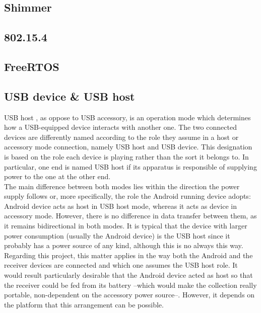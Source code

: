 		\subsection{Shimmer}
		\subsection{802.15.4}
		\label{ssec:802.15.4}
		\subsection{FreeRTOS}
		\label{ssec:FreeRTOS}
		\subsection{USB device \& USB host}
			USB host \cite{usbhost}, as oppose to USB accessory, is an operation mode which determines how a
			USB-equipped device interacts with another one. The two connected devices are differently named
			according to the role they assume in a host or accessory mode connection, namely USB host and USB
			device. This designation is based on the role each device is playing rather than the sort it belongs
			to. In particular, one end is named USB host if its apparatus is responsible of supplying power to
			the one at the other end.\\

			The main difference between both modes lies within the direction the power supply follows or, more
			specifically, the role the Android running device adopts: Android device acts as host in USB host
			mode, whereas it acts as device in accessory mode. However, there is no difference in data transfer
			between them, as it remains bidirectional in both modes. It is typical that the device with larger
			power consumption (usually the Android device) is the USB host since it probably has a power source
			of any kind, although this is no always this way.\\

			Regarding this project, this matter applies in the way both the Android and the receiver devices are
			connected and which one assumes the USB host role. It would result particularly desirable that the
			Android device acted as host so that the receiver could be fed from its battery --which would make the
			collection really portable, non-dependent on the accessory power source--. However, it depends on
			the platform that this arrangement can be possible.\\

